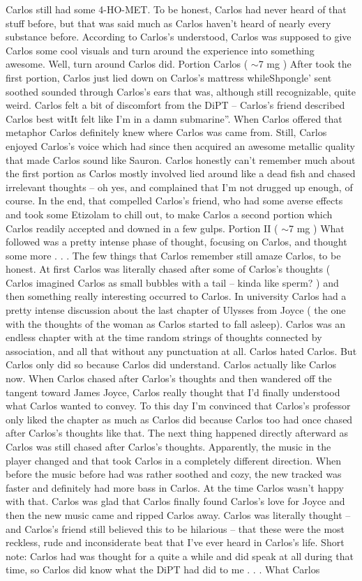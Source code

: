 \documentclass[12pt]{book}
\begin{document}
Carlos still had some 4-HO-MET. To be honest, Carlos had never heard of that stuff before, but that was said much as Carlos haven't heard of nearly every substance before. According to Carlos's understood, Carlos was supposed to give Carlos some cool visuals and turn around the experience into something awesome. Well, turn around Carlos did. Portion Carlos ( $\sim$7 mg ) After took the first portion, Carlos just lied down on Carlos's mattress whileShpongle' sent soothed sounded through Carlos's ears that was, although still recognizable, quite weird. Carlos felt a bit of discomfort from the DiPT -- Carlos's friend described Carlos best witIt felt like I'm in a damn submarine''. When Carlos offered that metaphor Carlos definitely knew where Carlos was came from. Still, Carlos enjoyed Carlos's voice which had since then acquired an awesome metallic quality that made Carlos sound like Sauron. Carlos honestly can't remember much about the first portion as Carlos mostly involved lied around like a dead fish and chased irrelevant thoughts -- oh yes, and complained that I'm not drugged up enough, of course. In the end, that compelled Carlos's friend, who had some averse effects and took some Etizolam to chill out, to make Carlos a second portion which Carlos readily accepted and downed in a few gulps. Portion II ( $\sim$7 mg ) What followed was a pretty intense phase of thought, focusing on Carlos, and thought some more . . .  The few things that Carlos remember still amaze Carlos, to be honest. At first Carlos was literally chased after some of Carlos's thoughts ( Carlos imagined Carlos as small bubbles with a tail -- kinda like sperm? ) and then something really interesting occurred to Carlos. In university Carlos had a pretty intense discussion about the last chapter of Ulysses from Joyce ( the one with the thoughts of the woman as Carlos started to fall asleep). Carlos was an endless chapter with at the time random strings of thoughts connected by association, and all that without any punctuation at all. Carlos hated Carlos. But Carlos only did so because Carlos did understand. Carlos actually like Carlos now. When Carlos chased after Carlos's thoughts and then wandered off the tangent toward James Joyce, Carlos really thought that I'd finally understood what Carlos wanted to convey. To this day I'm convinced that Carlos's professor only liked the chapter as much as Carlos did because Carlos too had once chased after Carlos's thoughts like that. The next thing happened directly afterward as Carlos was still chased after Carlos's thoughts. Apparently, the music in the player changed and that took Carlos in a completely different direction. When before the music before had was rather soothed and cozy, the new tracked was faster and definitely had more bass in Carlos. At the time Carlos wasn't happy with that. Carlos was glad that Carlos finally found Carlos's love for Joyce and then the new music came and ripped Carlos away. Carlos was literally thought -- and Carlos's friend still believed this to be hilarious -- that these were the most reckless, rude and inconsiderate beat that I've ever heard in Carlos's life. Short note: Carlos had was thought for a quite a while and did speak at all during that time, so Carlos did know what the DiPT had did to me . . .  What Carlos 
\end{document}
